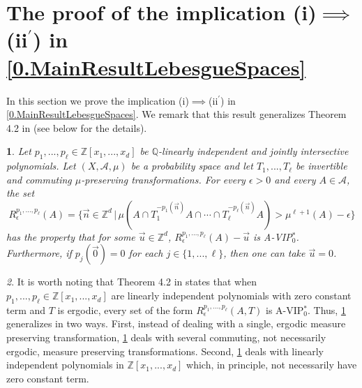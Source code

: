 \documentclass[11pt,american,preprint]{elsarticle}
\numberwithin{equation}{section}
\theoremstyle{plain}
\newtheorem{thm}{\protect\theoremname}[section]
\theoremstyle{plain*}
\theoremstyle{plain}
\theoremstyle{plain*}
\theoremstyle{plain}
\theoremstyle{plain*}
\theoremstyle{remark}
\theoremstyle{remark*}
\theoremstyle{remark}
\newtheorem{rem}[thm]{\protect\remarkname}
\theoremstyle{remark*}
\theoremstyle{remark}
\theoremstyle{remark*}
\theoremstyle{plain}
\theoremstyle{definition}
\theoremstyle{plain}
\theoremstyle{plain} %
\providecommand{\remarkname}{Remark}
\providecommand{\theoremname}{Theorem}
\newcommand{\Q}{\mathbb{Q}}
\newcommand{\Z}{\mathbb{Z}}
\begin{document}
\section{The proof of the implication (i)$\implies$(ii$^\prime$) in \cref{0.MainResultLebesgueSpaces}}\label{Sec4}
In this section we prove  the implication (i)$\implies$(ii$^\prime$) in \cref{0.MainResultLebesgueSpaces}. We remark that this result generalizes Theorem 4.2 in \cite{AlmostIPBerLeib} (see  below for the details).
\begin{thm}\label{4.GenBerLeib}
    Let $p_1,...,p_\ell\in\Z[x_1,...,x_d]$ be $\Q$-linearly independent and jointly intersective  polynomials. Let  $(X,\mathcal A,\mu)$ be a probability space and let $T_1,...,T_\ell$ be invertible and commuting $\mu$-preserving transformations. For every $\epsilon>0$ and every $A\in\mathcal A$,   the set
    \begin{equation}
        R_\epsilon^{p_1,...,p_\ell}(A)=\{\vec n\in\Z^d\,|\,\mu(A\cap T_1^{-p_1(\vec n)}A\cap \cdots\cap T_\ell^{-p_\ell(\vec n)}A)>\mu^{\ell+1}(A)-\epsilon\}
    \end{equation}
    has the property that for some ${\vec u}\in \Z^d$, $ R_\epsilon^{p_1,...,p_\ell}(A)-{\vec u}$ is {\rm A-VIP$_0^*$}. Furthermore, if $p_j(\vec 0)=0$ for each $j\in\{1,...,\ell\}$, then one can take ${\vec u}=0$. 
\end{thm}
\begin{rem}\label{RemarkAboutTheorem4.2}
It is worth noting that Theorem 4.2 in \cite{AlmostIPBerLeib} states that when $p_1,...,p_\ell\in\Z[x_1,...,x_d]$ are linearly independent polynomials with zero constant term and $T$ is ergodic, every set of the form $R_\epsilon^{p_1,...,p_\ell}(A,T)$ is A-VIP$_0^*$. Thus, 
 \cref{4.GenBerLeib} generalizes \cite[Theorem 4.2]{AlmostIPBerLeib} in two ways. First, instead of dealing with a single, ergodic measure preserving transformation, \cref{4.GenBerLeib} deals with several commuting, not necessarily ergodic, measure preserving transformations. Second,  \cref{4.GenBerLeib} deals with  linearly independent polynomials  in $\Z[x_1,...,x_d]$ which, in principle, not necessarily have  zero constant term. 
\end{rem}
\end{document}
